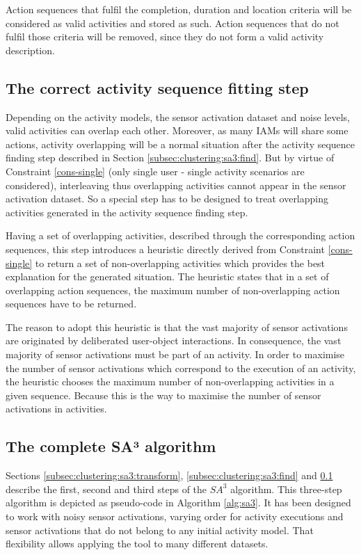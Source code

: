 Action sequences that fulfil the completion, duration and location criteria will be considered as valid activities and stored as such. Action sequences that do not fulfil those criteria will be removed, since they do not form a valid activity description.  

\subsection{The correct activity sequence fitting step}
\label{subsec:clustering:sa3:fit}
Depending on the activity models, the sensor activation dataset and noise levels, valid activities can overlap each other. Moreover, as many IAMs will share some actions, activity overlapping will be a normal situation after the activity sequence finding step described in Section \ref{subsec:clustering:sa3:find}. But by virtue of Constraint \ref{cons-single} (only single user - single activity scenarios are considered), interleaving thus overlapping activities cannot appear in the sensor activation dataset. So a special step has to be designed to treat overlapping activities generated in the activity sequence finding step. 

Having a set of overlapping activities, described through the corresponding action sequences, this step introduces a heuristic directly derived from Constraint \ref{cons-single} to return a set of non-overlapping activities which provides the best explanation for the generated situation. The heuristic states that in a set of overlapping action sequences, the maximum number of non-overlapping action sequences have to be returned. 

The reason to adopt this heuristic is that the vast majority of sensor activations are originated by deliberated user-object interactions. In consequence, the vast majority of sensor activations must be part of an activity. In order to maximise the number of sensor activations which correspond to the execution of an activity, the heuristic chooses the maximum number of non-overlapping activities in a given sequence. Because this is the way to maximise the number of sensor activations in activities.
 

\subsection{The complete SA³ algorithm}
\label{subsec:clustering:sa3:complete}

Sections \ref{subsec:clustering:sa3:transform}, \ref{subsec:clustering:sa3:find} and \ref{subsec:clustering:sa3:fit} describe the first, second and third steps of the $SA^3$ algorithm. This three-step algorithm is depicted as pseudo-code in Algorithm \ref{alg:sa3}. It has been designed to work with noisy sensor activations, varying order for activity executions and sensor activations that do not belong to any initial activity model. That flexibility allows applying the tool to many different datasets. 


